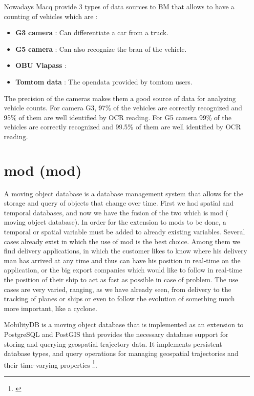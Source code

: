 \documentclass[12pt]{report}
\begin{document}
	Nowadays Macq provide 3 types of data sources to BM that allows to have a counting of vehicles which are : 
	\begin{itemize}[noitemsep]
		\item \textbf{G3 camera} : Can differentiate a car from a truck.
		\item \textbf{G5 camera} : Can also recognize the bran of the vehicle.
		\item \textbf{OBU Viapass} : 
		\item \textbf{Tomtom data} : The opendata provided by tomtom users. 
	\end{itemize}
	
	The precision of the cameras makes them a good source of data for analyzing vehicle counts. For camera G3, 97\% of the vehicles are correctly recognized and 95\% of them are well identified by OCR reading. For G5 camera 99\% of the vehicles are correctly recognized and 99.5\% of them are well identified by OCR reading.
	
	\section{\acrlong{mod} (\acrshort{mod})}
	\label{sec:MobilityDB-section}
	A moving object database is a database management system that allows for the storage and query of objects that change over time. First we had spatial and temporal databases, and now we have the fusion of the two which is \acrshort{mod} ( moving object database). 
	In order for the extension to \acrshort{mod}s to be done, a temporal or spatial variable must be added to already existing variables. Several cases already exist
	in which the use of \acrshort{mod} is the best choice. Among them we find delivery applications, in which the customer likes to know where his delivery man has arrived at any time and thus can have his position in real-time on the application, or the big export companies which would like to follow in real-time the position of their ship to act as fast as possible in case of problem.
	The use cases are very varied, ranging, as we have already seen, from delivery to the tracking of planes or ships or even to follow the evolution of something much more important, like a cyclone.
	
	MobilityDB is a moving object database that is implemented as an extension to PostgreSQL and PostGIS that provides the necessary database support for storing and querying geospatial trajectory data. It implements persistent database types, and query operations for managing geospatial trajectories and their time-varying properties \footnote{\cite{MobilityDBTODS2020}}. 
	
\end{document}
